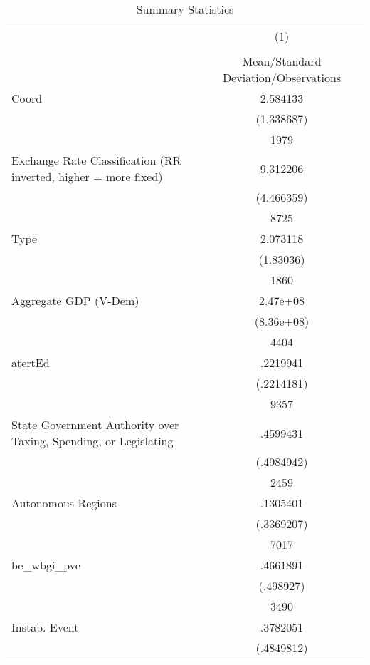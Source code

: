 {
\def\sym#1{\ifmmode^{#1}\else\(^{#1}\)\fi}
\begin{longtable}{l*{1}{c}}
\caption{Summary Statistics \label{sumstatsAll}}\\
\hline\hline\endfirsthead\hline\endhead\hline\endfoot\endlastfoot
                    &\multicolumn{1}{c}{(1)}\\
                    &\multicolumn{1}{c}{}\\
                    &Mean/Standard Deviation/Observations\\
\hline
Coord               &    2.584133\\
                    &  (1.338687)\\
                    &        1979\\
Exchange Rate Classification (RR inverted, higher = more fixed)&    9.312206\\
                    &  (4.466359)\\
                    &        8725\\
Type                &    2.073118\\
                    &   (1.83036)\\
                    &        1860\\
Aggregate GDP (V-Dem)&    2.47e+08\\
                    &  (8.36e+08)\\
                    &        4404\\
atertEd             &    .2219941\\
                    &  (.2214181)\\
                    &        9357\\
State Government Authority over Taxing, Spending, or Legislating&    .4599431\\
                    &  (.4984942)\\
                    &        2459\\
Autonomous Regions  &    .1305401\\
                    &  (.3369207)\\
                    &        7017\\
be\_wbgi\_pve         &    .4661891\\
                    &   (.498927)\\
                    &        3490\\
Instab. Event       &    .3782051\\
                    &  (.4849812)\\

\end{longtable}}
